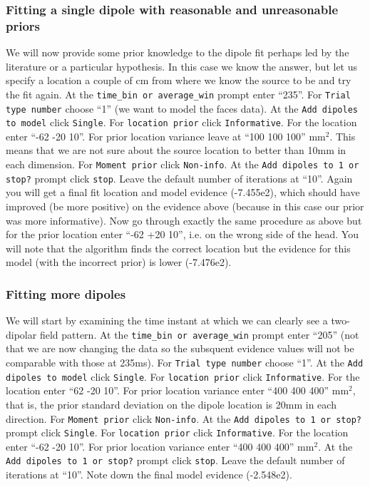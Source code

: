 \subsubsection{Fitting a single dipole with reasonable and unreasonable priors}
We will now provide some prior knowledge to the dipole fit perhaps led by the literature or a particular hypothesis. In this case we know the answer, but let us specify a location a couple of cm from where we know the source to be and try the fit again.
At the  \texttt{time\_bin or average\_win} prompt enter ``235''. For  \texttt{Trial type number} choose ``1'' (we want to model the faces data). At the  \texttt{Add dipoles to model} click  \texttt{Single}. For  \texttt{location prior} click  \texttt{Informative}. For the location enter ``-62 -20 10''. For prior location variance leave at ``100 100 100'' mm$^2$. This means that we are not sure about the source location to better than 10mm in each dimension. For  \texttt{Moment prior} click  \texttt{Non-info}. At the  \texttt{Add dipoles to 1 or stop?} prompt click  \texttt{stop}. Leave the default number of iterations at ``10''. Again you will get a final fit location and model evidence (-7.455e2), which should have improved (be more positive) on the evidence above (because in this case our prior was more informative). 
Now go through exactly the same procedure as above but for the prior location enter ``-62 +20 10'', i.e. on the wrong side of the head. You will note that the algorithm finds the correct location but the evidence for this model (with the incorrect prior) is lower (-7.476e2).

\subsubsection{Fitting more dipoles}
We will start by examining the time instant at which we can clearly see a two-dipolar field pattern.
At the \texttt{time\_bin or average\_win} prompt enter ``205'' (not that we are now changing the data so the subsquent evidence values will not be comparable with those at 235ms). For \texttt{Trial type number} choose ``1''. At the \texttt{Add dipoles to model} click \texttt{Single}. For \texttt{location prior} click \texttt{Informative}. For the location enter ``62 -20 10''. For prior location variance enter ``400 400 400'' mm$^2$, that is, the prior standard deviation on the dipole location is 20mm in each direction. For \texttt{Moment prior} click \texttt{Non-info}. At the \texttt{Add dipoles to 1 or stop?} prompt click \texttt{Single}. For \texttt{location prior} click \texttt{Informative}. For the location enter ``-62 -20 10''. For prior location variance enter ``400 400 400'' mm$^2$. At the \texttt{Add dipoles to 1 or stop?} prompt click \texttt{stop}. Leave the default number of iterations at ``10''. Note down the final model evidence (-2.548e2). 

